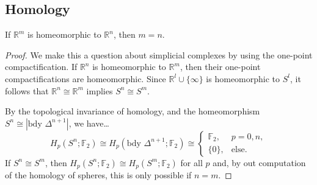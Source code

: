 \subsection{Homology}

\begin{theorem}
If $\mathbb{R}^m$ is homeomorphic to $\mathbb{R}^n$, then $m = n$.
\end{theorem}

\begin{proof}
We make this a question about simplicial complexes by using the one-point compactification. If $\mathbb{R}^n$
is homeomorphic to $\mathbb{R}^m$, then their one-point compactifications are homeomorphic. Since $\mathbb{R}^l \cup \{ \infty \}$
is homeomorphic to $S^l$, it follows that $\mathbb{R}^n \cong \mathbb{R}^m$ implies $S^n \cong S^m$.

By the topological invariance of homology, and the homeomorphism $S^n \cong |\textrm{bdy } \Delta^{n+1}|$, we have\dots
$$H_p(S^n; \mathbb{F}_2) \cong H_p(\textrm{bdy } \Delta^{n+1}; \mathbb{F}_2) \cong \begin{cases}\mathbb{F}_2, & p = 0,n,\\ \{ 0 \}, & \textrm{else.} \end{cases}$$
If $S^n \cong S^m$, then $H_p(S^n; \mathbb{F}_2) \cong H_p(S^m; \mathbb{F}_2)$ for all $p$ and, by out computation of the
homology of spheres, this is only possible if $n = m$.
\end{proof}